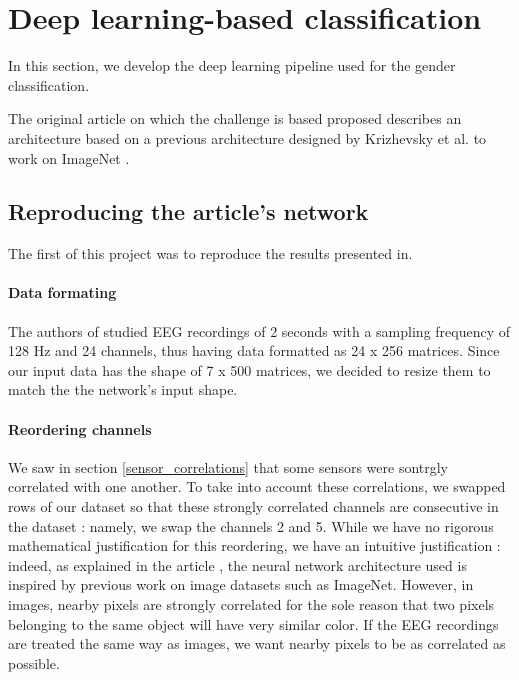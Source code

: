 \section{Deep learning-based classification}

In this section, we develop the deep learning pipeline used for the gender classification. 

The original article on which the challenge is based proposed \cite{vanPutten2018} describes an architecture based on a previous architecture designed by Krizhevsky et al. to work on ImageNet \cite{Krizhevsky2012}. 


\subsection{Reproducing the article's network}

The first of this project was to reproduce the results presented in\cite{vanPutten2018}. 

\paragraph{Data formating} The authors of\cite{vanPutten2018} studied EEG recordings of 2 seconds with a sampling frequency of 128 Hz and 24 channels, thus having data formatted as 24 x 256 matrices. Since our input data has the shape of 7 x 500 matrices, we decided to resize them to match the the network's input shape. 

\paragraph{Reordering channels} We saw in section \ref{sensor_correlations} that some sensors were sontrgly correlated with one another. To take into account these correlations, we swapped rows of our dataset so that these strongly correlated channels are consecutive in the dataset : namely, we swap the channels 2 and 5. While we have no rigorous mathematical justification for this reordering, we have an intuitive justification : indeed, as explained in the article \cite{vanPutten2018}, the neural network architecture used is inspired by previous work on image datasets such as ImageNet. However, in images, nearby pixels are strongly correlated for the sole reason that two pixels belonging to the same object will have very similar color. If the EEG recordings are treated the same way as images, we want nearby pixels to be as correlated as possible. 

